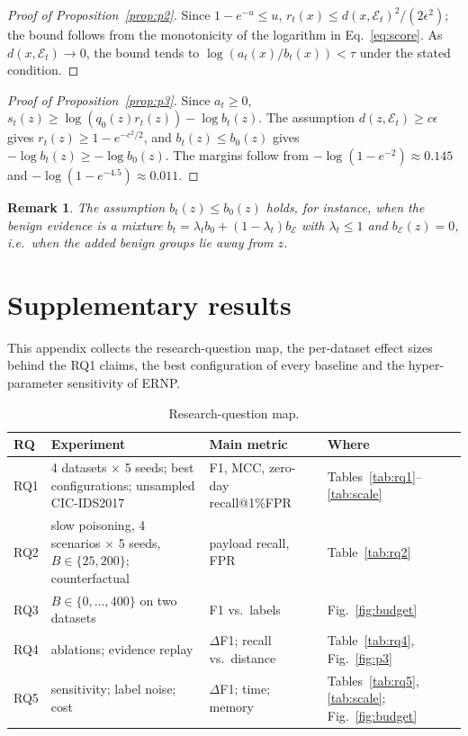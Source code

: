 \documentclass[a4paper,fleqn]{cas-dc}
\newcommand{\ERNP}{ERNP\xspace}
\newcommand{\E}{\mathcal{E}}
\newtheorem{remark}{Remark}
\begin{document}
\begin{proof}[Proof of Proposition~\ref{prop:p2}]
Since $1-e^{-u}\le u$, $r_t(x)\le d(x,\E_t)^2/(2\epsilon^2)$; the bound follows from the monotonicity of the logarithm in Eq.~\eqref{eq:score}. As $d(x,\E_t)\to0$, the bound tends to $\log(a_t(x)/b_t(x))<\tau$ under the stated condition.
\end{proof}

\begin{proof}[Proof of Proposition~\ref{prop:p3}]
Since $a_t\ge0$, $s_t(z)\ge\log(q_0(z)r_t(z))-\log b_t(z)$. The assumption $d(z,\E_t)\ge c\epsilon$ gives $r_t(z)\ge1-e^{-c^2/2}$, and $b_t(z)\le b_0(z)$ gives $-\log b_t(z)\ge-\log b_0(z)$. The margins follow from $-\log(1-e^{-2})\approx0.145$ and $-\log(1-e^{-4.5})\approx0.011$.
\end{proof}

\begin{remark}
The assumption $b_t(z)\le b_0(z)$ holds, for instance, when the benign evidence is a mixture $b_t=\lambda_t b_0+(1-\lambda_t)b_{\E}$ with $\lambda_t\le1$ and $b_{\E}(z)=0$, i.e.\ when the added benign groups lie away from $z$.
\end{remark}

\section{Supplementary results}
\label{app:supp}
This appendix collects the research-question map, the per-dataset effect sizes behind the RQ1 claims, the best configuration of every baseline and the hyper-parameter sensitivity of \ERNP.

\begin{table}[t]
\centering
\caption{Research-question map.}
\label{tab:rqmap}
\scriptsize
\setlength{\tabcolsep}{2.2pt}
\begin{tabularx}{\linewidth}{L{0.35}L{1.45}L{1.20}L{1.00}}
\toprule
RQ & Experiment & Main metric & Where \\
\midrule
RQ1 & 4 datasets $\times$ 5 seeds; best configurations; unsampled CIC-IDS2017 & F1, MCC, zero-day recall@1\%FPR & Tables~\ref{tab:rq1}--\ref{tab:scale} \\
RQ2 & slow poisoning, 4 scenarios $\times$ 5 seeds, $B\in\{25,200\}$; counterfactual & payload recall, FPR & Table~\ref{tab:rq2} \\
RQ3 & $B\in\{0,\dots,400\}$ on two datasets & F1 vs.\ labels & Fig.~\ref{fig:budget} \\
RQ4 & ablations; evidence replay & $\Delta$F1; recall vs.\ distance & Table~\ref{tab:rq4}, Fig.~\ref{fig:p3} \\
RQ5 & sensitivity; label noise; cost & $\Delta$F1; time; memory & Tables~\ref{tab:rq5}, \ref{tab:scale}; Fig.~\ref{fig:budget} \\
\bottomrule
\end{tabularx}
\end{table}
\end{document}
